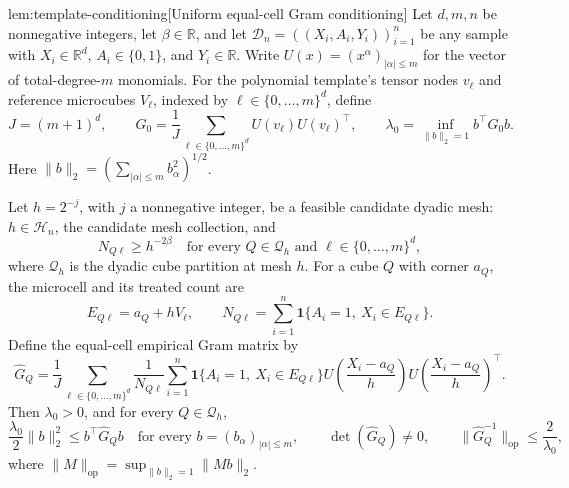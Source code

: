 \documentclass[11pt]{article}
\begin{document}
\begin{lemmav}{lem:template-conditioning}[Uniform equal-cell Gram conditioning]
Let \(d,m,n\) be nonnegative integers, let \(\beta\in\mathbb R\), and let \(\mathcal D_n=((X_i,A_i,Y_i))_{i=1}^n\) be any sample with \(X_i\in\mathbb R^d\), \(A_i\in\{0,1\}\), and \(Y_i\in\mathbb R\). Write \(U(x)=(x^\alpha)_{|\alpha|\le m}\) for the vector of total-degree-\(m\) monomials. For the polynomial template's tensor nodes \(v_\ell\) and reference microcubes \(V_\ell\), indexed by \(\ell\in\{0,\ldots,m\}^d\), define
\[
J=(m+1)^d,\qquad
G_0=\frac1J\sum_{\ell\in\{0,\ldots,m\}^d}
U(v_\ell)U(v_\ell)^\top,\qquad
\lambda_0=\inf_{\|b\|_2=1}b^\top G_0b.
\]
Here \(\|b\|_2=(\sum_{|\alpha|\le m}b_\alpha^2)^{1/2}\).

Let \(h=2^{-j}\), with \(j\) a nonnegative integer, be a feasible candidate dyadic mesh: \(h\in\mathcal H_n\), the candidate mesh collection, and
\[
N_{Q\ell}\ge h^{-2\beta}
\quad\text{for every }Q\in\mathcal Q_h
\text{ and }\ell\in\{0,\ldots,m\}^d,
\]
where \(\mathcal Q_h\) is the dyadic cube partition at mesh \(h\). For a cube \(Q\) with corner \(a_Q\), the microcell and its treated count are
\[
E_{Q\ell}=a_Q+hV_\ell,\qquad
N_{Q\ell}=\sum_{i=1}^n
\mathbf1\{A_i=1,\ X_i\in E_{Q\ell}\}.
\]
Define the equal-cell empirical Gram matrix by
\[
\widehat G_Q
=\frac1J\sum_{\ell\in\{0,\ldots,m\}^d}
\frac1{N_{Q\ell}}
\sum_{i=1}^n
\mathbf1\{A_i=1,\ X_i\in E_{Q\ell}\}
U\!\left(\frac{X_i-a_Q}{h}\right)
U\!\left(\frac{X_i-a_Q}{h}\right)^\top.
\]
Then \(\lambda_0>0\), and for every \(Q\in\mathcal Q_h\),
\[
\frac{\lambda_0}{2}\|b\|_2^2
\le b^\top\widehat G_Qb
\quad\text{for every }b=(b_\alpha)_{|\alpha|\le m},
\qquad
\det(\widehat G_Q)\ne0,
\qquad
\|\widehat G_Q^{-1}\|_{\mathrm{op}}
\le\frac2{\lambda_0},
\]
where \(\|M\|_{\mathrm{op}}=\sup_{\|b\|_2=1}\|Mb\|_2\).
\end{lemmav}
\end{document}

